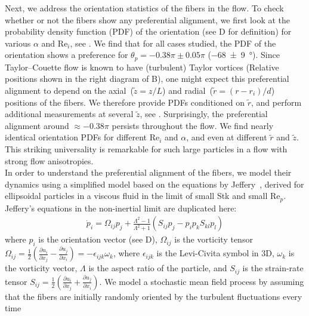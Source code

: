 \indent Next, we address the orientation statistics of the fibers in the flow.
To check whether or not the fibers show any preferential alignment, we first
look at the probability density function (PDF) of the orientation (see
D for definition) for various $\alpha$ and
$\text{Re}_i$, see . We find that for all cases studied, the PDF of the orientation shows a preference for
$\theta_p = -0.38\pi \pm 0.05\pi$ (\SI[separate-uncertainty =
true,multi-part-units=single]{-68(9)}{\degree}). Since Taylor--Couette flow
\cite{Grossmann2016} is known to have (turbulent) Taylor vortices \cite{Huisman2014, vanderVeen2016}
(Relative positions shown in the right diagram of B), one might expect this preferential alignment to depend on
the axial~($\tilde{z}=z/L$) and radial~($\tilde{r}=(r-r_i)/d$) positions of
the fibers. We therefore provide PDFs conditioned on $\tilde{r}$, and perform
additional measurements at several $\tilde{z}$, see .
Surprisingly, the preferential alignment around $\approx -0.38\pi$
persists throughout the flow. We find nearly identical orientation PDFs for
different $\text{Re}_i$ and $\alpha$, and even at different $\tilde{r}$ and
$\tilde{z}$. This striking universality is remarkable for such large particles
in a flow with strong flow anisotropies.\\%
%
\indent In order to understand the preferential alignment of the fibers, we
model their dynamics using a simplified model based on the equations by Jeffery~\cite{Jeffery1922}, derived for ellipsoidal particles in
a viscous fluid in the limit of small Stk and small $\text{Re}_p$. Jeffery's
equations in the non-inertial limit are duplicated here:
\begin{align}
\dot{p}_i = \Omega_{ij} p_j + \frac{\Lambda^2 - 1}{\Lambda^2 + 1} \left(
S_{ij}p_j - p_i p_k S_{kl} p_l \right) \label{eq:jeff}
\end{align}
where $p_i$ is the orientation vector (see D),
$\Omega_{ij}$ is the vorticity tensor
$\Omega_{ij}= \frac 12 \left(\frac{\partial u_i}{\partial x_j} - \frac{\partial u_j}{\partial x_i} \right) = -\epsilon_{ijk}\omega_k$,
where $\epsilon_{ijk}$ is the Levi-Civita symbol
in 3D, $\omega_k$ is the vorticity vector, $\Lambda$ is the aspect ratio of
the particle, and $S_{ij}$ is the strain-rate tensor 
$S_{ij}= \frac 12 \left(\frac{\partial u_i}{\partial x_j} + \frac{\partial u_j}{\partial x_i} \right)$.
We model a stochastic mean field process by assuming that the fibers
are initially randomly oriented by the turbulent fluctuations every time
